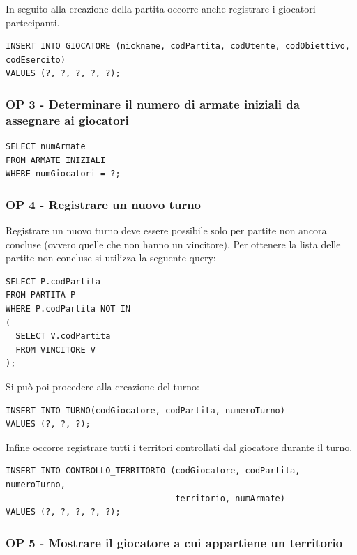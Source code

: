 \documentclass[a4paper,12pt]{report}
\begin{document}
In seguito alla creazione della partita occorre anche registrare i giocatori partecipanti.
\begin{verbatim}
INSERT INTO GIOCATORE (nickname, codPartita, codUtente, codObiettivo, codEsercito) 
VALUES (?, ?, ?, ?, ?);
\end{verbatim}

\subsubsection{OP 3 - Determinare il numero di armate iniziali da assegnare ai giocatori}

\begin{verbatim}
SELECT numArmate
FROM ARMATE_INIZIALI 
WHERE numGiocatori = ?;
\end{verbatim}

\subsubsection{OP 4 - Registrare un nuovo turno}

Registrare un nuovo turno deve essere possibile solo per partite non ancora concluse (ovvero quelle che non hanno un vincitore).
Per ottenere la lista delle partite non concluse si utilizza la seguente query:

\begin{verbatim}
SELECT P.codPartita
FROM PARTITA P
WHERE P.codPartita NOT IN 
(
  SELECT V.codPartita
  FROM VINCITORE V
);
\end{verbatim}

Si può poi procedere alla creazione del turno:

\begin{verbatim}
INSERT INTO TURNO(codGiocatore, codPartita, numeroTurno) 
VALUES (?, ?, ?);
\end{verbatim}

Infine occorre registrare tutti i territori controllati dal giocatore durante il turno.

\begin{verbatim}
INSERT INTO CONTROLLO_TERRITORIO (codGiocatore, codPartita, numeroTurno,
                                  territorio, numArmate) 
VALUES (?, ?, ?, ?, ?);
\end{verbatim}

\subsubsection{OP 5 - Mostrare il giocatore a cui appartiene un territorio}
\end{document}

